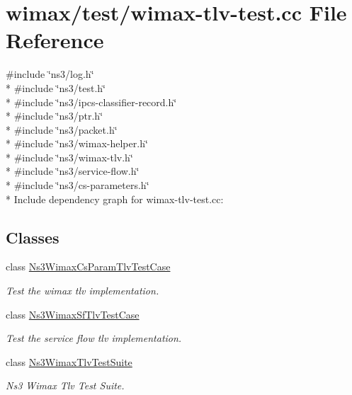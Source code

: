 \hypertarget{wimax-tlv-test_8cc}{}\section{wimax/test/wimax-\/tlv-\/test.cc File Reference}
\label{wimax-tlv-test_8cc}
{\ttfamily \#include \char`\"{}ns3/log.\+h\char`\"{}}\\*
{\ttfamily \#include \char`\"{}ns3/test.\+h\char`\"{}}\\*
{\ttfamily \#include \char`\"{}ns3/ipcs-\/classifier-\/record.\+h\char`\"{}}\\*
{\ttfamily \#include \char`\"{}ns3/ptr.\+h\char`\"{}}\\*
{\ttfamily \#include \char`\"{}ns3/packet.\+h\char`\"{}}\\*
{\ttfamily \#include \char`\"{}ns3/wimax-\/helper.\+h\char`\"{}}\\*
{\ttfamily \#include \char`\"{}ns3/wimax-\/tlv.\+h\char`\"{}}\\*
{\ttfamily \#include \char`\"{}ns3/service-\/flow.\+h\char`\"{}}\\*
{\ttfamily \#include \char`\"{}ns3/cs-\/parameters.\+h\char`\"{}}\\*
Include dependency graph for wimax-\/tlv-\/test.cc\+:
\subsection*{Classes}
\begin{DoxyCompactItemize}
\item 
class \hyperlink{classNs3WimaxCsParamTlvTestCase}{Ns3\+Wimax\+Cs\+Param\+Tlv\+Test\+Case}
\begin{DoxyCompactList}\small\item\em Test the wimax tlv implementation. \end{DoxyCompactList}\item 
class \hyperlink{classNs3WimaxSfTlvTestCase}{Ns3\+Wimax\+Sf\+Tlv\+Test\+Case}
\begin{DoxyCompactList}\small\item\em Test the service flow tlv implementation. \end{DoxyCompactList}\item 
class \hyperlink{classNs3WimaxTlvTestSuite}{Ns3\+Wimax\+Tlv\+Test\+Suite}
\begin{DoxyCompactList}\small\item\em Ns3 Wimax Tlv Test Suite. \end{DoxyCompactList}\end{DoxyCompactItemize}
